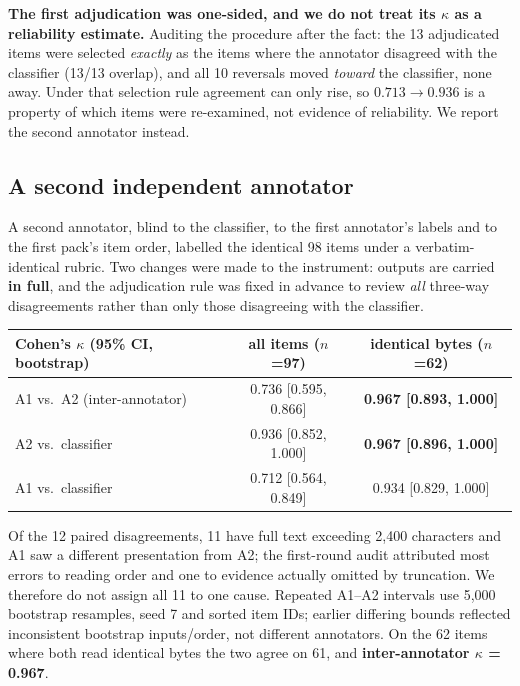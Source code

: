 \textbf{The first adjudication was one-sided, and we do not treat its $\kappa$ as a reliability
estimate.} Auditing the procedure after the fact: the 13 adjudicated items were selected
\emph{exactly} as the items where the annotator disagreed with the classifier (13/13 overlap),
and all 10 reversals moved \emph{toward} the classifier, none away. Under that selection rule
agreement can only rise, so $0.713 \to 0.936$ is a property of which items were re-examined,
not evidence of reliability. We report the second annotator instead.

\subsection*{A second independent annotator}

A second annotator, blind to the classifier, to the first annotator's labels and to the first
pack's item order, labelled the identical 98 items under a verbatim-identical rubric. Two
changes were made to the instrument: outputs are carried \textbf{in full}, and the adjudication
rule was fixed in advance to review \emph{all} three-way disagreements rather than only those
disagreeing with the classifier.

\begin{center}
\begin{minipage}{\linewidth}
\centering
\small
{}\label{tab:interannotator}
\begin{tabular}{@{}lcc@{}}
\toprule
Cohen's $\kappa$ (95\% CI, bootstrap) & all items ($n$=97) & \textbf{identical bytes ($n$=62)} \\
\midrule
A1 vs.\ A2 (inter-annotator) & 0.736 [0.595, 0.866] & \textbf{0.967 [0.893, 1.000]} \\
A2 vs.\ classifier           & 0.936 [0.852, 1.000] & \textbf{0.967 [0.896, 1.000]} \\
A1 vs.\ classifier           & 0.712 [0.564, 0.849] & 0.934 [0.829, 1.000] \\
\bottomrule
\end{tabular}
\end{minipage}
\end{center}

Of the 12 paired disagreements, 11 have full text exceeding 2,400 characters and A1 saw a
different presentation from A2; the first-round audit attributed most errors to reading order and
one to evidence actually omitted by truncation. We therefore do not assign all 11 to one cause.
Repeated A1--A2 intervals use 5,000 bootstrap resamples, seed 7 and sorted item IDs;
earlier differing bounds reflected inconsistent bootstrap inputs/order, not different annotators.
On the 62 items where both read identical bytes the two agree on 61, and
\textbf{inter-annotator $\kappa$ = 0.967}.

